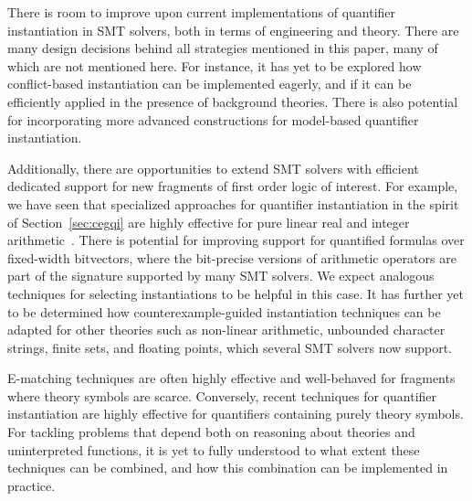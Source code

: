 \documentclass[oribibl]{llncs}
\begin{document}
There is room to improve upon current implementations of quantifier instantiation in SMT solvers,
both in terms of engineering and theory.
There are many design decisions behind all strategies mentioned in this paper, 
many of which are not mentioned here.
For instance, it has yet to be explored how conflict-based instantiation can be implemented eagerly,
and if it can be efficiently applied in the presence of background theories.
There is also potential for incorporating more advanced constructions 
for model-based quantifier instantiation.

Additionally, there are opportunities to extend SMT solvers with efficient dedicated support for
new fragments of first order logic of interest.
For example, we have seen that specialized approaches for quantifier instantiation in the spirit of Section~\ref{sec:cegqi} 
are highly effective for pure linear real and integer arithmetic~\cite{ReynoldsDKBT15Cav,DBLP:conf/lpar/BjornerJ15}.
There is potential for improving support for quantified formulas over fixed-width bitvectors,
where the bit-precise versions of arithmetic operators are part of the signature supported by many SMT solvers.
We expect analogous techniques for selecting instantiations to be helpful in this case.
It has further yet to be determined how counterexample-guided instantiation techniques can be adapted
for other theories such as non-linear arithmetic, unbounded character strings, finite sets, and floating points, 
which several SMT solvers now support.

E-matching techniques
are often highly effective and well-behaved for fragments where theory symbols are scarce.
Conversely, recent techniques for quantifier instantiation are highly effective for quantifiers containing purely theory symbols.
For tackling problems that depend both on reasoning about theories and uninterpreted functions,
it is yet to fully understood to what extent these techniques can be combined,
and how this combination can be implemented in practice.



\end{document}
